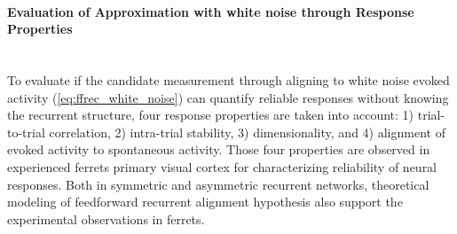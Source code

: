 \documentclass[11pt]{article}
\begin{document}
	\paragraph{Evaluation of Approximation with white noise through Response Properties}\mbox{}\\
	\newline
	To evaluate if the candidate measurement through aligning to white noise evoked activity (\ref{eq:ffrec_white_noise}) can quantify reliable responses without knowing the recurrent structure, four response properties are taken into account: 1) trial-to-trial correlation, 2) intra-trial stability, 3) dimensionality, and 4) alignment of evoked activity to spontaneous activity. Those four properties are observed in experienced ferrets primary visual cortex \cite{tragenap2023nature} for characterizing reliability of neural responses. Both in symmetric and asymmetric recurrent networks, theoretical modeling of feedforward recurrent alignment hypothesis also support the experimental observations in ferrets. 
	
\end{document}
